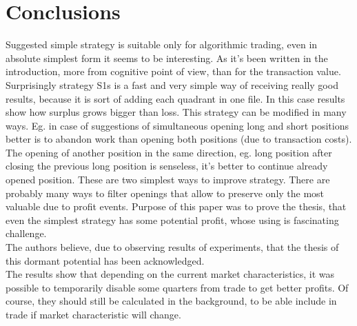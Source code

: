 \documentclass{tewiart}
\begin{document}
\section{Conclusions}
\indent Suggested simple strategy is suitable only for algorithmic trading, even in absolute simplest form it seems to be interesting. As it’s been written in the introduction, more from cognitive point of view, than for the transaction value.\\
Surprisingly strategy S1s is a fast and very simple way of receiving really good results, because it is sort of adding each quadrant in one file. In this case results show how surplus grows bigger than loss.
\indent This strategy can be modified in many ways.  Eg. in case of suggestions of simultaneous opening long and short positions better is to abandon work than opening both positions (due to transaction costs). The opening of another position in the same direction, eg. long position after closing the previous long position is senseless, it’s better to continue already opened position. These are two simplest ways to improve strategy. There are probably many ways to filter openings that allow to preserve only the most valuable due to profit events. Purpose of this paper was to prove the thesis, that even the simplest strategy has some potential profit, whose using is fascinating challenge.\\
\indent The authors believe, due to observing results of experiments, that the thesis of this dormant potential has been acknowledged. \\
The results show that depending on the current market characteristics, it was possible to temporarily disable some quarters from trade to get better profits. Of course, they should still be calculated in the background, to be able include in trade if market characteristic will change.





\end{document}
